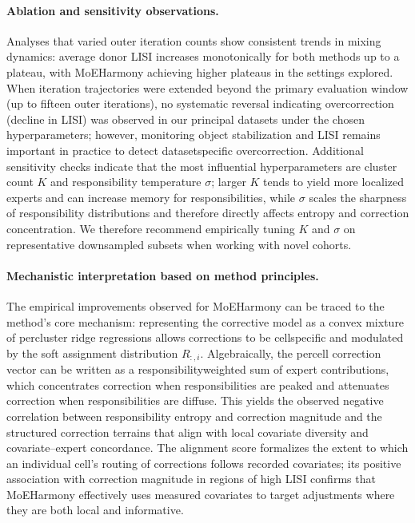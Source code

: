 \documentclass{article}
\begin{document}
\paragraph{Ablation and sensitivity observations.} Analyses that varied outer iteration counts show consistent trends in mixing dynamics: average donor LISI increases monotonically for both methods up to a plateau, with MoE\-Harmony achieving higher plateaus in the settings explored. When iteration trajectories were extended beyond the primary evaluation window (up to fifteen outer iterations), no systematic reversal indicating overcorrection (decline in LISI) was observed in our principal datasets under the chosen hyperparameters; however, monitoring object stabilization and LISI remains important in practice to detect dataset\-specific overcorrection. Additional sensitivity checks indicate that the most influential hyperparameters are cluster count $K$ and responsibility temperature $\sigma$; larger $K$ tends to yield more localized experts and can increase memory for responsibilities, while $\sigma$ scales the sharpness of responsibility distributions and therefore directly affects entropy and correction concentration. We therefore recommend empirically tuning $K$ and $\sigma$ on representative downsampled subsets when working with novel cohorts.

\paragraph{Mechanistic interpretation based on method principles.} The empirical improvements observed for MoE\-Harmony can be traced to the method’s core mechanism: representing the corrective model as a convex mixture of per\-cluster ridge regressions allows corrections to be cell\-specific and modulated by the soft assignment distribution $R_{:,i}$. Algebraically, the per\-cell correction vector can be written as a responsibility\-weighted sum of expert contributions, which concentrates correction when responsibilities are peaked and attenuates correction when responsibilities are diffuse. This yields the observed negative correlation between responsibility entropy and correction magnitude and the structured correction terrains that align with local covariate diversity and covariate–expert concordance. The alignment score formalizes the extent to which an individual cell’s routing of corrections follows recorded covariates; its positive association with correction magnitude in regions of high LISI confirms that MoE\-Harmony effectively uses measured covariates to target adjustments where they are both local and informative.
\end{document}
